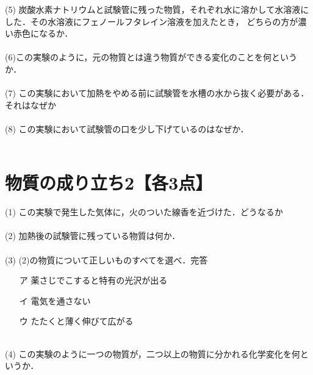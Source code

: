 \documentclass[autodetect-engine,dvi=dvipdfmx,ja=standard,
               a4j,11pt]{bxjsarticle}
\begin{document}
    (5) 炭酸水素ナトリウムと試験管に残った物質，それぞれ水に溶かして水溶液にした．その水溶液にフェノールフタレイン溶液を加えたとき，
    どちらの方が濃い赤色になるか．\\\\

    (6)この実験のように，元の物質とは違う物質ができる変化のことを何というか．\\\\

    (7) この実験において加熱をやめる前に試験管を水槽の水から抜く必要がある．それはなぜか\\\\

    (8) この実験において試験管の口を少し下げているのはなぜか．\\\\

    \clearpage
\section{物質の成り立ち2【各3点】}
\begin{figure}[htb]
        \centering
        \vspace{20pt} %
        \caption{}
\end{figure}
    (1) この実験で発生した気体に，火のついた線香を近づけた．どうなるか\\\\

    (2) 加熱後の試験管に残っている物質は何か．\\\\

    (3) (2)の物質について正しいものすべてを選べ．完答
    \begin{itemize}
        \item [ア]  薬さじでこすると特有の光沢が出る\\
        \item [イ]  電気を通さない\\
        \item [ウ]  たたくと薄く伸びて広がる\\\\
    \end{itemize}
    

    (4) この実験のように一つの物質が，二つ以上の物質に分かれる化学変化を何というか．\\\\
\end{document}
